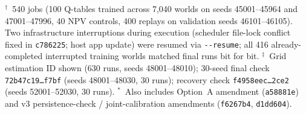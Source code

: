 \documentclass[11pt]{article}
\begin{document}
\begin{table}[h]
\begin{threeparttable}
\begin{tablenotes}[flushleft]
$^\dagger$~540 jobs (100 Q-tables trained across 7,040 worlds on seeds 45001--45964 and 47001--47996, 40 NPV controls, 400 replays on validation seeds 46101--46105). Two infrastructure interruptions during execution (scheduler file-lock conflict fixed in \texttt{c786225}; host app update) were resumed via \texttt{-{}-resume}; all 416 already-completed interrupted training worlds matched final runs bit for bit.
$^\ddagger$~Grid estimation ID shown (630 runs, seeds 48001--48010); 30-seed final check \texttt{72b47c19\ldots f7bf} (seeds 48001--48030, 30 runs); recovery check \texttt{f4958eec\ldots 2ce2} (seeds 52001--52030, 30 runs).
$^\ast$~Also includes Option~A amendment (\texttt{a58881e}) and v3 persistence-check / joint-calibration amendments (\texttt{f6267b4}, \texttt{d1dd604}).
\end{tablenotes}
\end{threeparttable}
\end{table}
\end{document}
